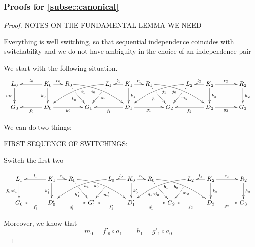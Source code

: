 \documentclass[a4paper,UKenglish,cleveref,pdftex, thm-restate,numberwithinsect,anonymous]{lipics}
\def\G{\textbf {\textup{G}}}
\begin{document}
\subsubsection{Proofs for \cref{subsec:canonical}}


\lemSwitchConfluence*
\label{lemSwitchConfluence-proof}

\begin{proof}
NOTES ON THE FUNDAMENTAL LEMMA WE NEED

Everything is well switching, so that sequential independence coincides with switchability and we do not have ambiguity in the choice of an independence pair


We start with the following situation.
\[\xymatrix@C=15pt{L_0\ar[d]_{m_0}&& K_0 \ar[d]_{k_0}\ar[ll]_{l_0} \ar[r]^{r_0} & R_0 \ar@/^.35cm/[drrr]_(.4){i_0}|(.285)\hole \ar[dr]|(.28)\hole_{h_0} && L_1 \ar@/_.35cm/[dlll]^(.4){i_1} \ar[dl]|(.28)\hole^{m_1}& K_1 \ar[d]^{k_1}\ar[l]_{l_1} \ar[r]^{r_1} & R_1 \ar[dr]|(.28)\hole_{h_1} \ar@/^.35cm/[drrr]_(.4){j_0}|(.285)\hole  && L_2 \ar@/_.35cm/[dlll]^(.4){j_1} \ar[dl]|(.28)\hole^{m_2}& K_2 \ar[d]^{k_2}\ar[l]_{l_2} \ar[rr]^{r_2} && R_2 \ar[d]^{h_2} \\G_0 && \ar[ll]^{f_0} D_0 \ar[rr]_{g_0}&& G_1  && \ar[ll]^{f_1} D_1 \ar[rr]_{g_1}&& G_2 && \ar[ll]^{f_2} D_2 \ar[rr]_{g_2}&& G_3 }\]

We can do two things:

FIRST SEQUENCE OF SWITCHINGS:

Switch the first two


\[\xymatrix@C=15pt{L_1\ar[d]_{f_0\circ i_1}&& K_1 \ar[d]_{k'_1}\ar[ll]_{l_1} \ar[r]^{r_1} & R_1 \ar@/^.35cm/[drrr]_(.4){a_0}|(.285)\hole \ar[dr]|(.28)\hole_{h'_1} && L_0 \ar@/_.35cm/[dlll]^(.4){a_1} \ar[dl]|(.28)\hole^{m'_0}& K_0 \ar[d]^{k'_0}\ar[l]_{l_0} \ar[r]^{r_0} & R_0 \ar[dr]|(.28)\hole_{g_1\circ j_0} \ar@/^.35cm/[drrr]_(.4){b_0}|(.285)\hole  && L_2 \ar@/_.35cm/[dlll]^(.4){b_1} \ar[dl]|(.28)\hole^{m_2}& K_2 \ar[d]^{k_2}\ar[l]_{l_2} \ar[rr]^{r_2} && R_2 \ar[d]^{h_2} \\G_0 && \ar[ll]^{f'_0} D'_0 \ar[rr]_{g'_0}&& G'_1  && \ar[ll]^{f'_1} D'_1 \ar[rr]_{g'_1}&& G_2 && \ar[ll]^{f_2} D_2 \ar[rr]_{g_2}&& G_3 }\]

Moreover, we know that
\[m_0=f'_0\circ a_1 \qquad h_1=g'_1\circ a_0\]


\end{proof}
\end{document}
